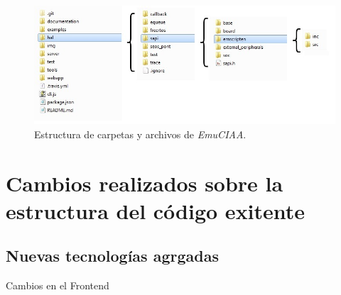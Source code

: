 \begin{figure}[ht]
	\centering
	\includegraphics[scale=.57]{./Figures/estructuraCiaa.jpg}
	\caption{Estructura de carpetas y archivos de \textit{EmuCIAA}.}
	\label{fig:estructuraCiaa}
\end{figure}




\section{Cambios realizados sobre la estructura del código exitente}
\label{sec:Cambios realizados sobre la estructura del código exitente}

\subsection{Nuevas tecnologías agrgadas}

Cambios en el Frontend

